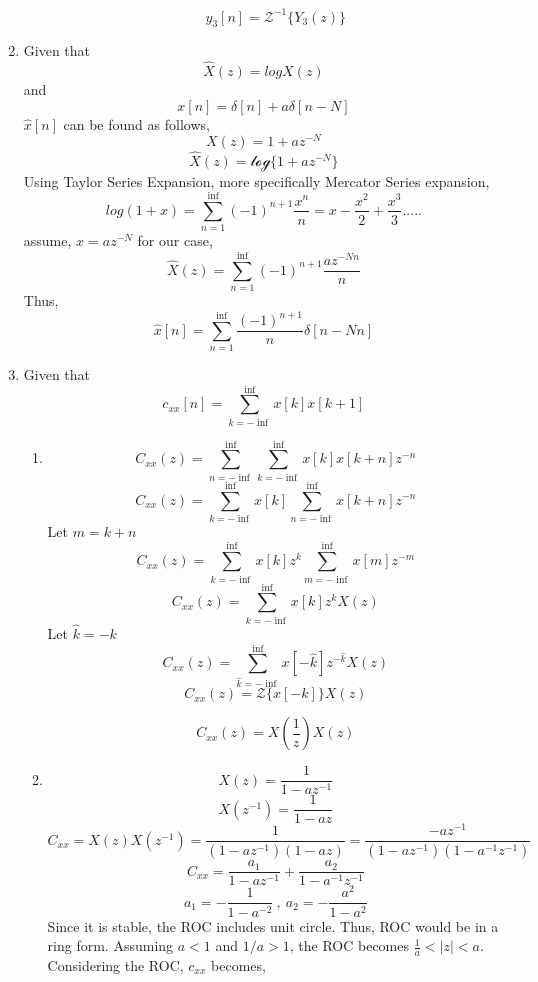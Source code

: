 \documentclass[a4paper,12pt]{article}
\begin{document}
\begin{enumerate}
\begin{enumerate}
				$$ \boxed{	y_3[n]=\mathcal{Z}^{-1}\{ Y_3(z) \}	}$$		
		\end{enumerate}
	
		
	\item Given that
		$$ \hat{X}(z)=logX(z)$$
		and 
		$$ x[n]=\delta [n]+a\delta [n-N]$$
		$\hat{x}[n]$ can be found as follows,
		$$ X(z)=1+az^{-N} $$
		$$ \hat{X}(z)=\mathcal{log}\{ 1+az^{-N} \} $$
		Using Taylor Series Expansion, more specifically Mercator Series expansion,
		$$	log(1+x)=\sum_{n=1}^{\inf}({-1})^{n+1}\frac{x^n}{n}=x-\frac{x^2}{2}+\frac{x^3}{3}.....	$$
		assume, $x=az^{-N}$ for our case,
		$$ \hat{X}(z)=\sum_{n=1}^{\inf}({-1})^{n+1}\frac{az^{-Nn}}{n} $$
		Thus,
		$$\boxed{ \hat{x}[n]=\sum_{n=1}^{\inf} \frac{({-1})^{n+1}}{n}\delta[n-Nn] }$$
		
	\item Given that
		$$ c_{xx}[n]=\sum_{k=-\inf}^{\inf} x[k]x[k+1] $$
		
		\begin{enumerate}
			\item $$ C_{xx}(z)=\sum_{n=-\inf}^{\inf} \sum_{k=-\inf}^{\inf} x[k]x[k+n]z^{-n} $$
				$$ C_{xx}(z)=\sum_{k=-\inf}^{\inf} x[k] \sum_{n=-\inf}^{\inf} x[k+n] z^{-n}$$
				Let $m=k+n$
				$$ C_{xx}(z)=\sum_{k=-\inf}^{\inf} x[k]z^k \sum_{m=-\inf}^{\inf} x[m] z^{-m}$$
				$$ C_{xx}(z)=\sum_{k=-\inf}^{\inf} x[k]z^k X(z)$$
				Let $\hat{k}=-k$
				$$ C_{xx}(z)=\sum_{\hat{k}=-\inf}^{\inf} x[-\hat{k}]z^{-\hat{k}} X(z)$$
				$$ C_{xx}(z)=\mathcal{Z}\{x[-k]\} X(z)$$
				
				$$\boxed{ C_{xx}(z)=X(\frac{1}{z}) X(z) }$$
				
				
			\item 
				$$X(z)=\frac{1}{1-az^{-1}} $$
				$$X(z^{-1})=\frac{1}{1-az} $$
				$$ C_{xx}=X(z)X(z^{-1})=\frac{1}{(1-az^{-1})(1-az)}=\frac{-az^{-1}}{(1-az^{-1})(1-a^{-1}z^{-1})} $$
				$$ C_{xx}=\frac{a_1}{1-az^{-1}}+\frac{a_2}{1-a^{-1}z^{-1}}$$
				$$ \boxed{a_1=-\frac{1}{1-a^{-2}}} \ , \  \boxed{a_2=-\frac{a^2}{1-a^2}} $$
Since it is stable, the ROC includes unit circle. Thus, ROC would be in a ring form. Assuming $a<1$ and $1/a>1$, the ROC becomes $\frac{1}{a}<|z|<a$. Considering the ROC, $c_{xx}$ becomes,
				

\end{enumerate}
\end{enumerate}
\end{document}
